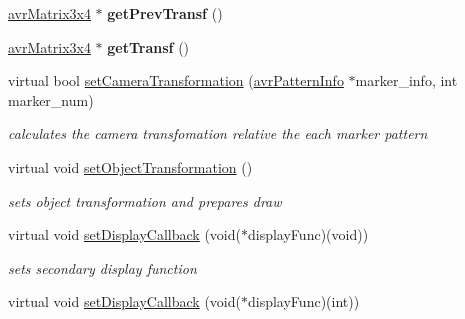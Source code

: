 \begin{DoxyCompactItemize}
\item 
\hypertarget{classavr_system_auto_multi_ab3776d9d3a377e1f8ee130f5b427f641}{\hyperlink{classavr_matrix3x4}{avr\-Matrix3x4} $\ast$ {\bfseries get\-Prev\-Transf} ()}\label{classavr_system_auto_multi_ab3776d9d3a377e1f8ee130f5b427f641}

\item 
\hypertarget{classavr_system_auto_multi_a2120f522f8f9a9d02031db03c37bd925}{\hyperlink{classavr_matrix3x4}{avr\-Matrix3x4} $\ast$ {\bfseries get\-Transf} ()}\label{classavr_system_auto_multi_a2120f522f8f9a9d02031db03c37bd925}

\item 
\hypertarget{classavr_system_auto_multi_aa5fda68ead553d6146ef38f53d12a4ed}{virtual bool \hyperlink{classavr_system_auto_multi_aa5fda68ead553d6146ef38f53d12a4ed}{set\-Camera\-Transformation} (\hyperlink{classavr_pattern_info}{avr\-Pattern\-Info} $\ast$marker\-\_\-info, int marker\-\_\-num)}\label{classavr_system_auto_multi_aa5fda68ead553d6146ef38f53d12a4ed}

\begin{DoxyCompactList}\small\item\em calculates the camera transfomation relative the each marker pattern \end{DoxyCompactList}\item 
\hypertarget{classavr_system_auto_multi_a8fc6be5311998a51056f8f4b2e443094}{virtual void \hyperlink{classavr_system_auto_multi_a8fc6be5311998a51056f8f4b2e443094}{set\-Object\-Transformation} ()}\label{classavr_system_auto_multi_a8fc6be5311998a51056f8f4b2e443094}

\begin{DoxyCompactList}\small\item\em sets object transformation and prepares draw \end{DoxyCompactList}\item 
\hypertarget{classavr_system_auto_multi_a4b34ac9e730e6942e82f3f17a5dd0bb6}{virtual void \hyperlink{classavr_system_auto_multi_a4b34ac9e730e6942e82f3f17a5dd0bb6}{set\-Display\-Callback} (void($\ast$display\-Func)(void))}\label{classavr_system_auto_multi_a4b34ac9e730e6942e82f3f17a5dd0bb6}

\begin{DoxyCompactList}\small\item\em sets secondary display function \end{DoxyCompactList}\item 
\hypertarget{classavr_system_auto_multi_adb5f93027373d9f360e2e8d20e1b1549}{virtual void \hyperlink{classavr_system_auto_multi_adb5f93027373d9f360e2e8d20e1b1549}{set\-Display\-Callback} (void($\ast$display\-Func)(int))}\label{classavr_system_auto_multi_adb5f93027373d9f360e2e8d20e1b1549}


\end{DoxyCompactItemize}
